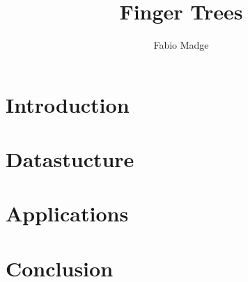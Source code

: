 \documentclass[a4paper,draft]{article}
\begin{document}
\title{Finger Trees}
\author{Fabio Madge}
\date{}
\maketitle

\begin{abstract}

\end{abstract}

\section{Introduction}


\section{Datastucture}


\section{Applications}


\section{Conclusion}


\listofalgorithms



\end{document}
